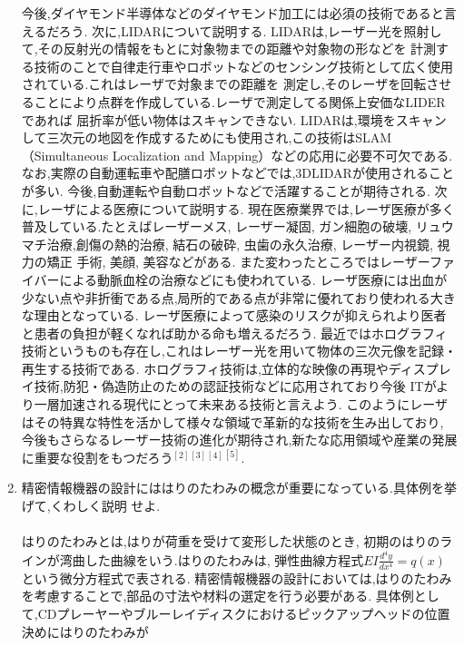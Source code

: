 \documentclass[a4paper,11pt]{jsarticle}
\begin{document}
\begin{enumerate}
        今後,ダイヤモンド半導体などのダイヤモンド加工には必須の技術であると言えるだろう.
        \quad 次に,LIDARについて説明する.
        LIDARは,レーザー光を照射して,その反射光の情報をもとに対象物までの距離や対象物の形などを
        計測する技術のことで自律走行車やロボットなどのセンシング技術として広く使用されている.これはレーザで対象までの距離を
        測定し,そのレーザを回転させることにより点群を作成している.レーザで測定してる関係上安価なLIDERであれば
        屈折率が低い物体はスキャンできない.
        LIDARは,環境をスキャンして三次元の地図を作成するためにも使用され,この技術はSLAM
        （Simultaneous Localization and Mapping）などの応用に必要不可欠である.
        なお,実際の自動運転車や配膳ロボットなどでは,3DLIDARが使用されることが多い.
        今後,自動運転や自動ロボットなどで活躍することが期待される.
        \quad 次に,レーザによる医療について説明する.
        現在医療業界では,レーザ医療が多く普及している.たとえばレーザーメス, レーザー凝固, ガン細胞の破壊, リュウマチ治療,創傷の熱的治療,
        結石の破砕, 虫歯の永久治療, レーザー内視鏡, 視力の矯正 手術, 美顔, 美容などがある.
        また変わったところではレーザーファイバーによる動脈血栓の治療などにも使われている.
        レーザ医療には出血が少ない点や非折衝である点,局所的である点が非常に優れており使われる大きな理由となっている.
        レーザ医療によって感染のリスクが抑えられより医者と患者の負担が軽くなれば助かる命も増えるだろう.
        \quad 最近ではホログラフィ技術というものも存在し,これはレーザー光を用いて物体の三次元像を記録・再生する技術である.
        ホログラフィ技術は,立体的な映像の再現やディスプレイ技術,防犯・偽造防止のための認証技術などに応用されており今後
        ITがより一層加速される現代にとって未来ある技術と言えよう.
        このようにレーザはその特異な特性を活かして様々な領域で革新的な技術を生み出しており,
        今後もさらなるレーザー技術の進化が期待され,新たな応用領域や産業の発展に重要な役割をもつだろう$^{[2]}$$^{[3]}$$^{[4]}$$^{[5]}$.
        \\
  \item 精密情報機器の設計にははりのたわみの概念が重要になっている.具体例を挙げて,くわしく説明
        せよ.\\
        \\
        \quad はりのたわみとは,はりが荷重を受けて変形した状態のとき,
        初期のはりのラインが湾曲した曲線をいう.はりのたわみは,
        弾性曲線方程式$EI \frac{{d^4y}}{{dx^4}} = q(x)$
        という微分方程式で表される.
        精密情報機器の設計においては,はりのたわみを考慮することで,部品の寸法や材料の選定を行う必要がある.
        具体例として,CDプレーヤーやブルーレイディスクにおけるピックアップヘッドの位置決めにはりのたわみが
$$
\end{enumerate}
\end{document}
